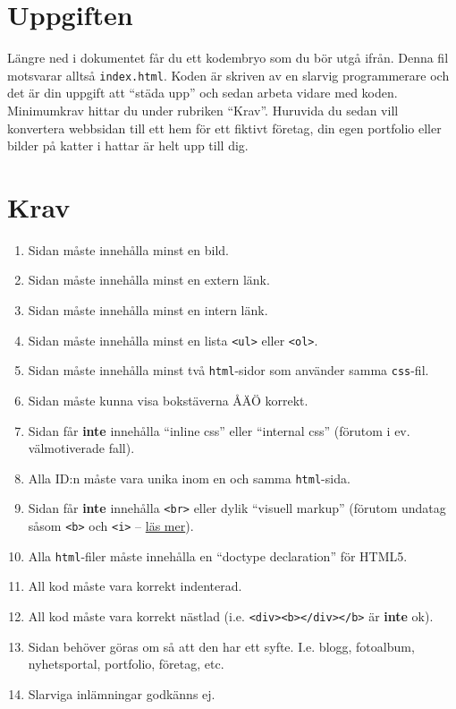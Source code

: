 \documentclass{article}
\begin{document}
\section{Uppgiften}
Längre ned i dokumentet får du ett kodembryo som du bör utgå ifrån. Denna fil motsvarar alltså \texttt{index.html}. Koden är skriven av en slarvig programmerare och det är din uppgift att ``städa upp'' och sedan arbeta vidare med koden. Minimumkrav hittar du under rubriken ``Krav''. Huruvida du sedan vill konvertera webbsidan till ett hem för ett fiktivt företag, din egen portfolio eller bilder på katter i hattar är helt upp till dig. 



\pagebreak
\section{Krav}
\begin{enumerate}
\item Sidan måste innehålla minst en bild.
\item Sidan måste innehålla minst en extern länk.
\item Sidan måste innehålla minst en intern länk.
\item Sidan måste innehålla minst en lista \texttt{<ul>} eller \texttt{<ol>}.
\item Sidan måste innehålla minst två \texttt{html}-sidor som använder samma \texttt{css}-fil.
\item Sidan måste kunna visa bokstäverna ÅÄÖ korrekt.
\item Sidan får \textbf{inte} innehålla ``inline css'' eller ``internal css'' (förutom i ev. välmotiverade fall).
\item Alla ID:n måste vara unika inom en och samma \texttt{html}-sida.
\item Sidan får \textbf{inte} innehålla \texttt{<br>} eller dylik ``visuell markup'' (förutom undatag såsom \texttt{<b>} och \texttt{<i>} -- \href{http://html5doctor.com/i-b-em-strong-element/}{läs mer}).
\item Alla \texttt{html}-filer måste innehålla en ``doctype declaration'' för HTML5.
\item All kod måste vara korrekt indenterad.
\item All kod måste vara korrekt nästlad (i.e. \texttt{<div><b></div></b>} är \textbf{inte} ok).
\item Sidan behöver göras om så att den har ett syfte. I.e. blogg, fotoalbum, nyhetsportal, portfolio, företag, etc.
\item Slarviga inlämningar godkänns ej.
\end{enumerate}
\end{document}
